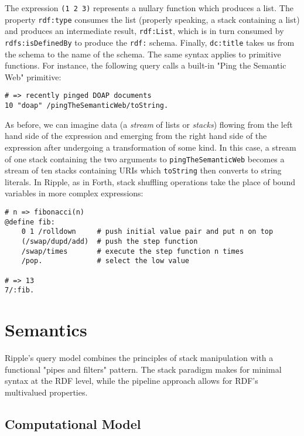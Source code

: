 \documentclass[runningheads]{llncs}
\begin{document}
The expression \texttt{(1 2 3)} represents a nullary function which produces a list.  The property \texttt{rdf:type}  consumes the list (properly speaking, a stack containing a list) and produces an intermediate result, \texttt{rdf:List}, which is in turn consumed by \texttt{rdfs:isDefinedBy} to produce the \texttt{rdf:} schema.  Finally, \texttt{dc:title} takes us from the schema to the name of the schema.
The same syntax applies to primitive functions.  For instance, the following query calls a built-in "Ping the Semantic Web" primitive:
\begin{verbatim}
# => recently pinged DOAP documents
10 "doap" /pingTheSemanticWeb/toString.
\end{verbatim}
As before, we can imagine data (a \textit{stream} of lists or \textit{stacks}) flowing from the left hand side of the expression and emerging from the right hand side of the expression after undergoing a transformation of some kind.  In this case, a stream of one stack containing the two arguments to \texttt{pingTheSemanticWeb} becomes a stream of ten stacks containing URIs which \texttt{toString} then converts to string literals.
In Ripple, as in Forth, stack shuffling operations take the place of bound variables in more complex expressions:
\begin{verbatim}
# n => fibonacci(n)
@define fib:
    0 1 /rolldown     # push initial value pair and put n on top
    (/swap/dupd/add)  # push the step function
    /swap/times       # execute the step function n times
    /pop.             # select the low value

# => 13
7/:fib.
\end{verbatim}










\section{Semantics}

Ripple's query model combines the principles of stack manipulation with a functional "pipes and filters" pattern.  The stack paradigm makes for minimal syntax at the RDF level, while the pipeline approach allows for RDF's multivalued properties.




\subsection{Computational Model}
\end{document}
